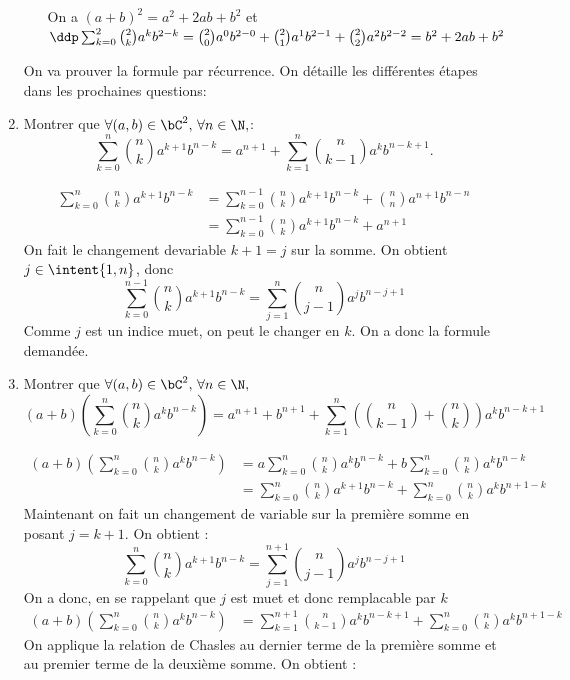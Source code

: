 \begin{correction}
\begin{correction}
\begin{enumerate}
\begin{enumerate}
On a 
$(a+b)^2 =a^2+2ab+b^2$ et 
$\ddp \sum_{k=0}^2 \binom{2}{k}a^k b^{2-k} = \binom{2}{0}a^0 b^{2-0}+\binom{2}{1}a^1 b^{2-1}+\binom{2}{2}a^2 b^{2-2} =b^2+2ab+b^2$


\end{enumerate}
 









On va prouver la formule par récurrence. On détaille les différentes étapes dans les prochaines questions: 
\item Montrer que $\forall (a,b)\in \bC^2,\,  \forall n \in \N, $:
$$\sum_{k=0}^n \binom{n}{k}a^{k+1} b^{n-k} = a^{n+1}+\sum_{k=1}^{n} \binom{n}{k-1}a^{k} b^{n-k+1}.$$


\begin{align*}
\sum_{k=0}^n \binom{n}{k}a^{k+1} b^{n-k}  &= \sum_{k=0}^{n-1} \binom{n}{k}a^{k+1} b^{n-k}  + \binom{n}{n}a^{n+1} b^{n-n} \\
&= \sum_{k=0}^{n-1} \binom{n}{k}a^{k+1} b^{n-k}  + a^{n+1} 
\end{align*}
On fait le changement devariable $k+1=j$ sur la somme. On obtient 
$j\in \intent{1,n}$, donc 
$$\sum_{k=0}^{n-1} \binom{n}{k}a^{k+1} b^{n-k}  = \sum_{j=1}^{n} \binom{n}{j-1}a^{j} b^{n-j+1} $$
Comme $j$ est un indice muet, on peut le changer en $k$. On a donc la formule demandée.




\item Montrer que $\forall (a,b)\in \bC^2,\,  \forall n \in \N, $
$$(a+b)\left( \sum_{k=0}^n \binom{n}{k}a^k b^{n-k}\right) = a^{n+1}+b^{n+1}+\sum_{k=1}^{n} \left( \binom{n}{k-1}+\binom{n}{k}\right)a^{k} b^{n-k+1}$$



\begin{align*}
(a+b)\left( \sum_{k=0}^n \binom{n}{k}a^k b^{n-k}\right) &=a  \sum_{k=0}^n \binom{n}{k}a^k b^{n-k} +b\sum_{k=0}^n \binom{n}{k}a^k b^{n-k}\\
&= \sum_{k=0}^n \binom{n}{k}a^{k+1} b^{n-k} +\sum_{k=0}^n \binom{n}{k}a^k b^{n+1-k} 
\end{align*}
Maintenant on fait un changement de variable sur la première somme en posant $j =k+1$. On obtient : 
$$ \sum_{k=0}^n \binom{n}{k}a^{k+1} b^{n-k}= \sum_{j=1}^{n+1} \binom{n}{j-1}a^{j} b^{n-j+1}$$
On a donc, en se rappelant que $j$ est muet et donc remplacable par $k$
\begin{align*}
(a+b)\left( \sum_{k=0}^n \binom{n}{k}a^k b^{n-k}\right) &= \sum_{k=1}^{n+1} \binom{n}{k-1}a^{k} b^{n-k+1}+ \sum_{k=0}^{n} \binom{n}{k}a^{k} b^{n+1-k}
\end{align*}
On applique la relation de Chasles au  dernier terme de la première somme et au premier terme de la deuxième somme. On obtient : 


\end{enumerate}
\end{correction}
\end{correction}
